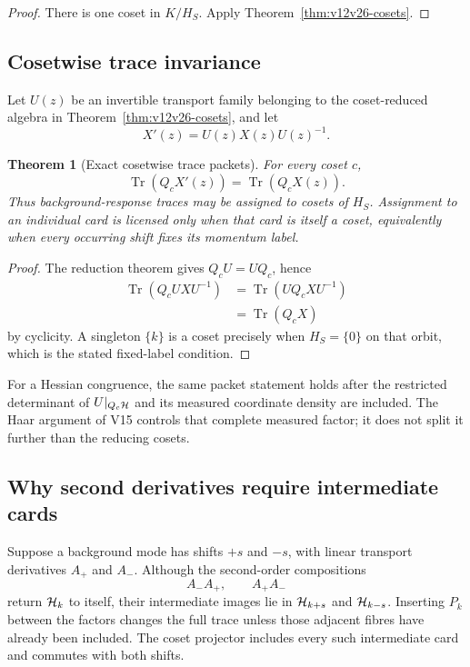 \documentclass[11pt]{article}
\newtheorem{theorem}{Theorem}[section]
\theoremstyle{remark}
\begin{document}
\begin{proof}
There is one coset in \(K/H_S\).  Apply
Theorem~\ref{thm:v12v26-cosets}.
\end{proof}

\subsection{Cosetwise trace invariance}

Let \(U(z)\) be an invertible transport family belonging to the
coset-reduced algebra in Theorem~\ref{thm:v12v26-cosets}, and let
\[
                         X'(z)=U(z)X(z)U(z)^{-1}.            \tag{26.7}
\]

\begin{theorem}[Exact cosetwise trace packets]
\label{thm:v12v26-trace}
For every coset \(c\),
\[
 \boxed{
 \operatorname{Tr}\!\left(Q_cX'(z)\right)
 =
 \operatorname{Tr}\!\left(Q_cX(z)\right).}                 \tag{26.8}
\]
Thus background-response traces may be assigned to cosets of
\(H_S\).  Assignment to an individual card is licensed only when
that card is itself a coset, equivalently when every occurring shift
fixes its momentum label.
\end{theorem}

\begin{proof}
The reduction theorem gives \(Q_cU=UQ_c\), hence
\[
\begin{split}
 \operatorname{Tr}(Q_cUXU^{-1})
 &=
 \operatorname{Tr}(UQ_cXU^{-1})\\
 &=\operatorname{Tr}(Q_cX)
\end{split}
\]
by cyclicity.  A singleton \(\{k\}\) is a coset precisely when
\(H_S=\{0\}\) on that orbit, which is the stated fixed-label
condition.
\end{proof}

For a Hessian congruence, the same packet statement holds after the
restricted determinant of \(U|_{Q_c{\cal H}}\) and its measured
coordinate density are included.  The Haar argument of V15 controls
that complete measured factor; it does not split it further than the
reducing cosets.

\subsection{Why second derivatives require intermediate cards}

Suppose a background mode has shifts \(+s\) and \(-s\), with
linear transport derivatives \(A_+\) and \(A_-\).  Although the
second-order compositions
\[
                         A_-A_+,\qquad A_+A_-               \tag{26.9}
\]
return \({\cal H}_k\) to itself, their intermediate images lie in
\({\cal H}_{k+s}\) and \({\cal H}_{k-s}\).  Inserting \(P_k\) between
the factors changes the full trace unless those adjacent fibres have
already been included.  The coset projector includes every such
intermediate card and commutes with both shifts.
\end{document}
